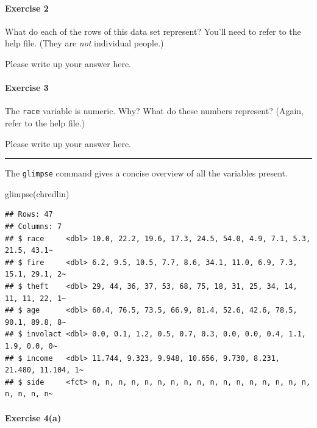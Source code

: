\documentclass[
]{book}
\newenvironment{Shaded}{\begin{snugshade}}{\end{snugshade}}
\newcommand{\FunctionTok}[1]{\textcolor[rgb]{0.00,0.00,0.00}{#1}}
\newcommand{\NormalTok}[1]{#1}
\begin{document}
\hypertarget{exercise-2-2}{%
\paragraph*{Exercise 2}\label{exercise-2-2}}

What do each of the rows of this data set represent? You'll need to refer to the help file. (They are \emph{not} individual people.)

Please write up your answer here.

\hypertarget{exercise-3-2}{%
\paragraph*{Exercise 3}\label{exercise-3-2}}

The \texttt{race} variable is numeric. Why? What do these numbers represent? (Again, refer to the help file.)

Please write up your answer here.

\begin{center}\rule{0.5\linewidth}{0.5pt}\end{center}

The \texttt{glimpse} command gives a concise overview of all the variables present.

\begin{Shaded}
\begin{Highlighting}[]
\FunctionTok{glimpse}\NormalTok{(chredlin)}
\end{Highlighting}
\end{Shaded}

\begin{verbatim}
## Rows: 47
## Columns: 7
## $ race     <dbl> 10.0, 22.2, 19.6, 17.3, 24.5, 54.0, 4.9, 7.1, 5.3, 21.5, 43.1~
## $ fire     <dbl> 6.2, 9.5, 10.5, 7.7, 8.6, 34.1, 11.0, 6.9, 7.3, 15.1, 29.1, 2~
## $ theft    <dbl> 29, 44, 36, 37, 53, 68, 75, 18, 31, 25, 34, 14, 11, 11, 22, 1~
## $ age      <dbl> 60.4, 76.5, 73.5, 66.9, 81.4, 52.6, 42.6, 78.5, 90.1, 89.8, 8~
## $ involact <dbl> 0.0, 0.1, 1.2, 0.5, 0.7, 0.3, 0.0, 0.0, 0.4, 1.1, 1.9, 0.0, 0~
## $ income   <dbl> 11.744, 9.323, 9.948, 10.656, 9.730, 8.231, 21.480, 11.104, 1~
## $ side     <fct> n, n, n, n, n, n, n, n, n, n, n, n, n, n, n, n, n, n, n, n, n~
\end{verbatim}

\hypertarget{exercise-4a}{%
\paragraph*{Exercise 4(a)}\label{exercise-4a}}
\end{document}
